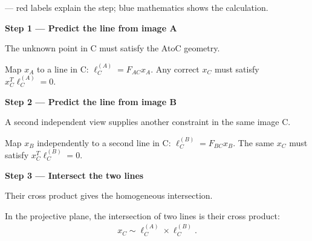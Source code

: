 \documentclass[letterpaper,11pt,english,openany,oneside]{jupyterBook}
\begin{document}
\par\medskip

\sphinxAtStartPar
{} — red labels explain the step; blue mathematics shows the calculation.

\par\medskip{}
{\color{QuizStepRed}\bfseries Step 1 — Predict the line from image A}\par\smallskip

\sphinxAtStartPar
{} The unknown point in C must satisfy the A\sphinxhyphen{}to\sphinxhyphen{}C geometry.

\sphinxAtStartPar
Map {\color{QuizMathBlue} \(x_A\)} to a line in C: {\color{QuizMathBlue} \(\boxed{\ell_C^{(A)}=F_{AC}x_A}\)}. Any correct {\color{QuizMathBlue} \(x_C\)} must satisfy {\color{QuizMathBlue} \(x_C^T\ell_C^{(A)}=0\)}.

\par

\par\medskip{}
{\color{QuizStepRed}\bfseries Step 2 — Predict the line from image B}\par\smallskip

\sphinxAtStartPar
{} A second independent view supplies another constraint in the same image C.

\sphinxAtStartPar
Map {\color{QuizMathBlue} \(x_B\)} independently to a second line in C: {\color{QuizMathBlue} \(\boxed{\ell_C^{(B)}=F_{BC}x_B}\)}. The same {\color{QuizMathBlue} \(x_C\)} must satisfy {\color{QuizMathBlue} \(x_C^T\ell_C^{(B)}=0\)}.

\par

\par\medskip{}
{\color{QuizStepRed}\bfseries Step 3 — Intersect the two lines}\par\smallskip

\sphinxAtStartPar
{} Their cross product gives the homogeneous intersection.

\sphinxAtStartPar
In the projective plane, the intersection of two lines is their cross product:
{\color{QuizMathBlue} \begin{equation*}
\begin{split}
\boxed{x_C\sim \ell_C^{(A)}\times\ell_C^{(B)}}.
\end{split}
\end{equation*}}
\par
\end{document}
